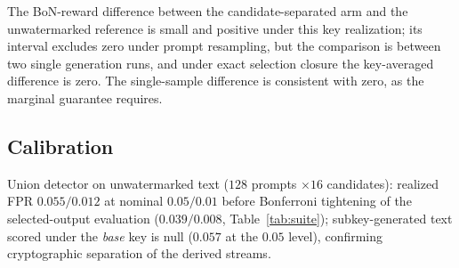 \documentclass{article} %
\begin{document}
The BoN-reward difference between the candidate-separated arm and the
unwatermarked reference is small and positive under this key realization;
its interval excludes zero under prompt resampling, but the comparison is
between two single generation runs, and under exact selection closure the
key-averaged difference is zero. The single-sample difference is consistent
with zero, as the marginal guarantee requires.

\subsection{Calibration}
Union detector on unwatermarked text ($128$ prompts $\times16$ candidates):
realized FPR $0.055/0.012$ at nominal $0.05/0.01$ before Bonferroni tightening
of the selected-output evaluation ($0.039/0.008$, Table~\ref{tab:suite});
subkey-generated text scored under the \emph{base} key is null
($0.057$ at the $0.05$ level), confirming cryptographic separation of the
derived streams.
\end{document}
